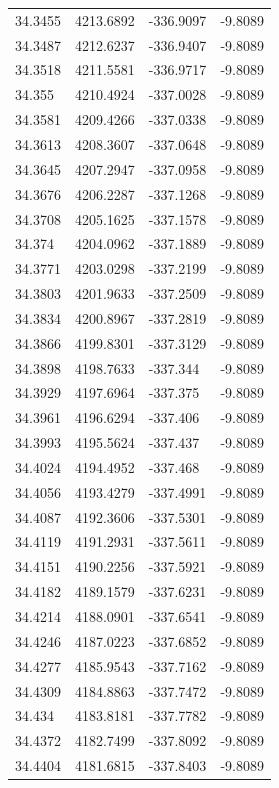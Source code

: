 \begin{table}[H]
\begin{tabular}{llll}
34.3455 & 4213.6892 & -336.9097 & -9.8089 \\
34.3487 & 4212.6237 & -336.9407 & -9.8089 \\
34.3518 & 4211.5581 & -336.9717 & -9.8089 \\
34.355 & 4210.4924 & -337.0028 & -9.8089 \\
34.3581 & 4209.4266 & -337.0338 & -9.8089 \\
34.3613 & 4208.3607 & -337.0648 & -9.8089 \\
34.3645 & 4207.2947 & -337.0958 & -9.8089 \\
34.3676 & 4206.2287 & -337.1268 & -9.8089 \\
34.3708 & 4205.1625 & -337.1578 & -9.8089 \\
34.374 & 4204.0962 & -337.1889 & -9.8089 \\
34.3771 & 4203.0298 & -337.2199 & -9.8089 \\
34.3803 & 4201.9633 & -337.2509 & -9.8089 \\
34.3834 & 4200.8967 & -337.2819 & -9.8089 \\
34.3866 & 4199.8301 & -337.3129 & -9.8089 \\
34.3898 & 4198.7633 & -337.344 & -9.8089 \\
34.3929 & 4197.6964 & -337.375 & -9.8089 \\
34.3961 & 4196.6294 & -337.406 & -9.8089 \\
34.3993 & 4195.5624 & -337.437 & -9.8089 \\
34.4024 & 4194.4952 & -337.468 & -9.8089 \\
34.4056 & 4193.4279 & -337.4991 & -9.8089 \\
34.4087 & 4192.3606 & -337.5301 & -9.8089 \\
34.4119 & 4191.2931 & -337.5611 & -9.8089 \\
34.4151 & 4190.2256 & -337.5921 & -9.8089 \\
34.4182 & 4189.1579 & -337.6231 & -9.8089 \\
34.4214 & 4188.0901 & -337.6541 & -9.8089 \\
34.4246 & 4187.0223 & -337.6852 & -9.8089 \\
34.4277 & 4185.9543 & -337.7162 & -9.8089 \\
34.4309 & 4184.8863 & -337.7472 & -9.8089 \\
34.434 & 4183.8181 & -337.7782 & -9.8089 \\
34.4372 & 4182.7499 & -337.8092 & -9.8089 \\
34.4404 & 4181.6815 & -337.8403 & -9.8089 \\

\end{tabular}
\end{table}
